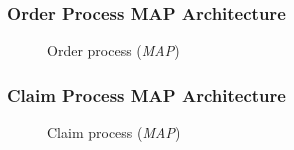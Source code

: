 \subsubsection{Order Process MAP Architecture}
\label{sec:order_map}
\begin{center}
	\begin{figure}[H]
		\centering
		\setlength\fboxsep{7pt}
		\setlength\fboxrule{0.5pt}
		\caption{Order process (\emph{MAP})}
		\label{fig:map_order}
	\end{figure}
\end{center}
%
\subsubsection{Claim Process MAP Architecture}
\label{sec:claim_map}
\begin{center}
	\begin{figure}[H]
		\centering
		\setlength\fboxsep{7pt}
		\setlength\fboxrule{0.5pt}
		\caption{Claim process (\emph{MAP})}
		\label{fig:map_claim}
	\end{figure}
\end{center}
%
